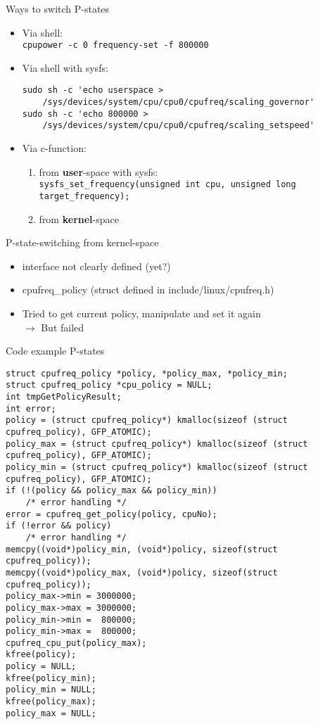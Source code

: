 \begin{frame}[fragile]{Ways to switch P-states}
	\begin{itemize}
		\item	Via shell:\\
			\lstinline$cpupower -c 0 frequency-set -f 800000$
		\item	Via shell with sysfs:
			\begin{lstlisting}
sudo sh -c 'echo userspace >
    /sys/devices/system/cpu/cpu0/cpufreq/scaling_governor'
sudo sh -c 'echo 800000 >
    /sys/devices/system/cpu/cpu0/cpufreq/scaling_setspeed'
\end{lstlisting}
		\item	Via c-function:
			\begin{enumerate} 
				\item from \textbf{user}-space with sysfs:\\
					\lstinline$sysfs_set_frequency(unsigned int cpu, unsigned long target_frequency);$
				\item from \textbf{kernel}-space
			\end{enumerate}
	\end{itemize}
\end{frame}

\begin{frame}{P-state-switching from kernel-space}
	\begin{itemize}
		\item interface not clearly defined (yet?) %
		\item cpufreq\_policy (struct defined in include/linux/cpufreq.h)
		\item Tried to get current policy, manipulate and set it again\\
			$\rightarrow$ But failed
	\end{itemize}
\end{frame}

\begin{frame}[fragile]{Code example P-states}
	\begin{lstlisting}
struct cpufreq_policy *policy, *policy_max, *policy_min;
struct cpufreq_policy *cpu_policy = NULL;
int tmpGetPolicyResult;
int error;
policy = (struct cpufreq_policy*) kmalloc(sizeof (struct cpufreq_policy), GFP_ATOMIC);
policy_max = (struct cpufreq_policy*) kmalloc(sizeof (struct cpufreq_policy), GFP_ATOMIC);
policy_min = (struct cpufreq_policy*) kmalloc(sizeof (struct cpufreq_policy), GFP_ATOMIC);
if (!(policy && policy_max && policy_min))
    /* error handling */
error = cpufreq_get_policy(policy, cpuNo); 
if (!error && policy)
    /* error handling */
memcpy((void*)policy_min, (void*)policy, sizeof(struct cpufreq_policy));
memcpy((void*)policy_max, (void*)policy, sizeof(struct cpufreq_policy));
policy_max->min = 3000000;
policy_max->max = 3000000;
policy_min->min =  800000;
policy_min->max =  800000;
cpufreq_cpu_put(policy_max);
kfree(policy);
policy = NULL;
kfree(policy_min);
policy_min = NULL;
kfree(policy_max);
policy_max = NULL;
\end{lstlisting}
\end{frame}

